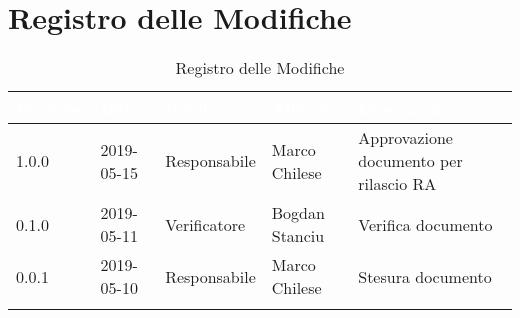 \newpage

\section*{Registro delle Modifiche}

\begin{center}
\begin{longtable}[c]{|m{}|m{}|m{}|m{}|p{}|}
\hline
\rowcolor{bluelogo}\textbf{\textcolor{white}{Versione}} & \textbf{\textcolor{white}{Data}} & \textbf{\textcolor{white}{Ruolo}} & \textbf{\textcolor{white}{Autore}} & \textbf{\textcolor{white}{Descrizione}}\\
\hline \hline
\endfirsthead
1.0.0 & 2019-05-15 & Responsabile & Marco Chilese & Approvazione documento per rilascio RA  \\
\hline
\rowcolor{grigio} 0.1.0 & 2019-05-11 & Verificatore & Bogdan Stanciu & Verifica documento \\
\hline
0.0.1 & 2019-05-10 & Responsabile & Marco Chilese & Stesura documento \\
\hline
\caption{Registro delle Modifiche}
\end{longtable}
\end{center}
